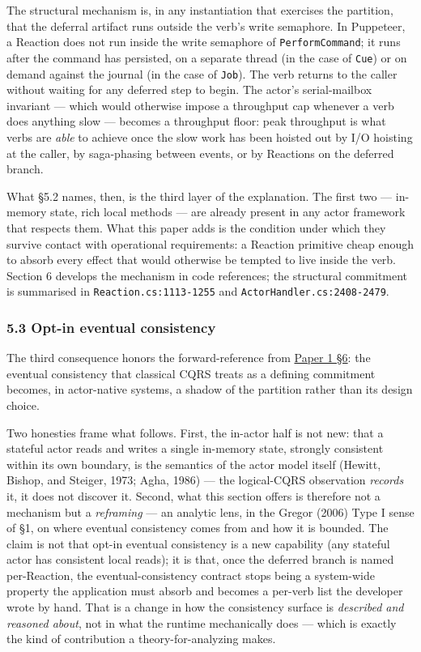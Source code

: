 \documentclass[
]{article}
\let\origtexttt\texttt%
\renewcommand{\texttt}[1]{\origtexttt{\seqsplit{#1}}}%
\let\texttt\origtexttt%
\begin{document}
The structural mechanism is, in any instantiation that exercises the
partition, that the deferral artifact runs outside the verb's write
semaphore. In Puppeteer, a Reaction does not run inside the write
semaphore of \texttt{PerformCommand}; it runs after the command has
persisted, on a separate thread (in the case of \texttt{Cue}) or on
demand against the journal (in the case of \texttt{Job}). The verb
returns to the caller without waiting for any deferred step to begin.
The actor's serial-mailbox invariant --- which would otherwise impose a
throughput cap whenever a verb does anything slow --- becomes a
throughput floor: peak throughput is what verbs are \emph{able} to
achieve once the slow work has been hoisted out by I/O hoisting at the
caller, by saga-phasing between events, or by Reactions on the deferred
branch.

What §5.2 names, then, is the third layer of the explanation. The first
two --- in-memory state, rich local methods --- are already present in
any actor framework that respects them. What this paper adds is the
condition under which they survive contact with operational
requirements: a Reaction primitive cheap enough to absorb every effect
that would otherwise be tempted to live inside the verb. Section 6
develops the mechanism in code references; the structural commitment is
summarised in \texttt{Reaction.cs:1113-1255} and
\texttt{ActorHandler.cs:2408-2479}.

\subsubsection{5.3 Opt-in eventual
consistency}\label{opt-in-eventual-consistency}

The third consequence honors the forward-reference from
\href{01-anti-porosity.md}{Paper 1 §6}: the eventual consistency that
classical CQRS treats as a defining commitment becomes, in actor-native
systems, a shadow of the partition rather than its design choice.

Two honesties frame what follows. First, the in-actor half is not new:
that a stateful actor reads and writes a single in-memory state,
strongly consistent within its own boundary, is the semantics of the
actor model itself (Hewitt, Bishop, and Steiger, 1973; Agha, 1986) ---
the logical-CQRS observation \emph{records} it, it does not discover it.
Second, what this section offers is therefore not a mechanism but a
\emph{reframing} --- an analytic lens, in the Gregor (2006) Type I sense
of §1, on where eventual consistency comes from and how it is bounded.
The claim is not that opt-in eventual consistency is a new capability
(any stateful actor has consistent local reads); it is that, once the
deferred branch is named per-Reaction, the eventual-consistency contract
stops being a system-wide property the application must absorb and
becomes a per-verb list the developer wrote by hand. That is a change in
how the consistency surface is \emph{described and reasoned about}, not
in what the runtime mechanically does --- which is exactly the kind of
contribution a theory-for-analyzing makes.
\end{document}

